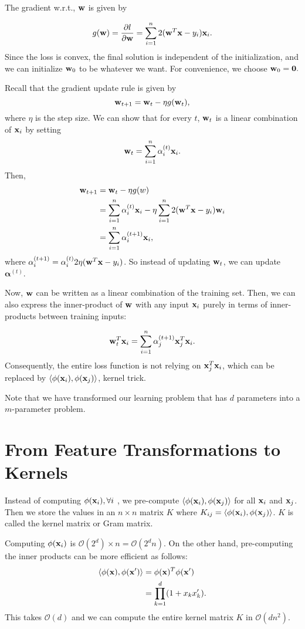 The gradient w.r.t., ${\mathbf{w}}$ is given by 

$$g({\mathbf{w}}) = \frac{\partial l}{\partial {\mathbf{w}}} = \sum_{i=1}^{n}2({\mathbf{w}}^T{\mathbf{x}} - y_i){\mathbf{x}}_i.$$
Since the loss is convex, the final solution is independent of the initialization, and we can initialize ${\mathbf{w}}_0$ to be whatever we want. For convenience, we choose ${\mathbf{w}}_0=\mathbf{0}.$

Recall that the gradient update rule is given by
$${\mathbf{w}}_{t+1} = {\mathbf{w}}_t-\eta g({\mathbf{w}}_t),$$
where $\eta$ is the step size. We can show that for every $t$, ${\mathbf{w}}_t$ is a linear combination of ${\mathbf{x}}_i$ by setting 
$${\mathbf{w}}_t = \sum_{i=1}^{n}\alpha_i^{(t)}{\mathbf{x}}_i.$$
Then,
\begin{align*}
	{\mathbf{w}}_{t+1} &= {\mathbf{w}}_t - \eta g(w)\\
			   &= \sum_{i=1}^{n}\alpha_i^{(t)}{\mathbf{x}}_i-\eta\sum_{i=1}^{n}2({\mathbf{w}}^T{\mathbf{x}} - y_i){\mathbf{w}}_i\\
			   &= \sum_{i=1}^{n}\alpha_i^{(t+1)}{\mathbf{x}}_i,
\end{align*}
where $\alpha_i^{(t+1)} = \alpha_i^{(t)}2\eta({\mathbf{w}}^T{\mathbf{x}} - y_i)$. So instead of updating ${\mathbf{w}}_t$, we can update $\boldsymbol{\alpha}^{(t)}$.

Now, ${\mathbf{w}}$ can be written as a linear combination of the training set. Then, we can also express the inner-product of ${\mathbf{w}}$ with any input ${\mathbf{x}}_i$ purely in terms of inner-products between training inputs:

$${\mathbf{w}}_t^T{\mathbf{x}}_i = \sum_{i=1}^{n}\alpha_j^{(t+1)}{\mathbf{x}}_j^T{\mathbf{x}}_i.$$
Consequently, the entire loss function is not relying on ${\mathbf{x}}_j^T{\mathbf{x}}_i$, which can be replaced by $\langle \phi({\mathbf{x}}_i), \phi({\mathbf{x}}_j)\rangle$, kernel trick. 

Note that we have transformed our learning problem that has $d$ parameters into a $m$-parameter problem. 

\section{From Feature Transformations to Kernels}
\label{sec:kernel:kernels}
Instead of computing $\phi({\mathbf{x}}_i), \forall i$ , we pre-compute $\langle \phi({\mathbf{x}}_i), \phi({\mathbf{x}}_j)\rangle$ for all ${\mathbf{x}}_i$ and ${\mathbf{x}}_j$. Then we store the values in an $n\times n$ matrix $K$ where $K_{ij}= \langle \phi({\mathbf{x}}_i), \phi({\mathbf{x}}_j)\rangle$. $K$ is called the kernel matrix or Gram matrix. 

Computing $\phi({\mathbf{x}}_i)$ is $\mathcal{O}(2^d)\times n = \mathcal{O}(2^dn)$. On the other hand, pre-computing the inner products can be more efficient as follows:
\begin{align*}
	\langle \phi({\mathbf{x}}), \phi({\mathbf{x}}')\rangle &= \phi({\mathbf{x}})^T\phi({\mathbf{x}}')\\ 
										   &= \prod_{k=1}^d(1+x_kx'_k).
\end{align*}
This takes $\mathcal{O}(d)$ and we can compute the entire kernel matrix $K$ in $\mathcal{O}(dn^2)$. 

